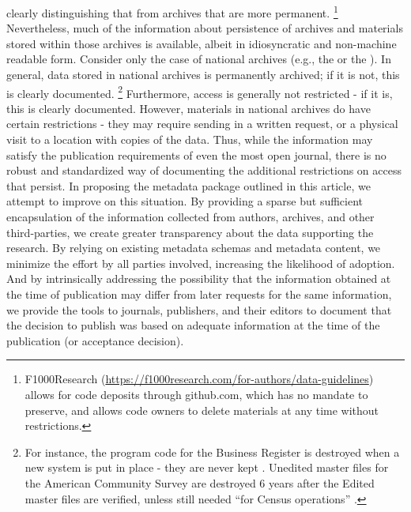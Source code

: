 clearly distinguishing that from archives that are more permanent.%
\footnote{F1000Research (\url{https://f1000research.com/for-authors/data-guidelines}) allows for code deposits through github.com, which has no mandate to preserve, and allows code owners to delete materials at any time without restrictions.}
Nevertheless, much of the information about persistence of archives and
materials stored within those archives is available, albeit in
idiosyncratic and non-machine readable form. Consider only the case of
national archives (e.g., the  or the ). 
In general, data stored in national archives is
permanently archived; if it is not, this is clearly documented.%
\footnote{For instance, the program code for the Business Register is destroyed when a new system is put in place - they are never kept \parencite{U.S.CensusBureauRecordsControlSchedule2009}. Unedited master files for the American Community Survey are destroyed 6 years after the Edited master files are verified, unless still needed ``for Census operations'' \parencite{U.S.CensusBureauRecordsControlSchedule1999}.}
Furthermore, access is generally not restricted - if it is, this is
clearly documented. However, materials in national archives do have
certain restrictions - they may require sending in a written request, or
a physical visit to a location with copies of the data. Thus, while the
information may satisfy the publication requirements of even the most
open journal, there is no robust and standardized way of documenting the
additional restrictions on access that persist. In proposing the
metadata package outlined in this article, we attempt to improve on this
situation. By providing a sparse but sufficient encapsulation of the
information collected from authors, archives, and other third-parties,
we create greater transparency about the data supporting the research.
By relying on existing metadata schemas and metadata content, we
minimize the effort by all parties involved, increasing the likelihood
of adoption. And by intrinsically addressing the possibility that the
information obtained at the time of publication may differ from later
requests for the same information, we provide the tools to journals,
publishers, and their editors to document that the decision to publish
was based on adequate information at the time of the publication (or
acceptance decision).